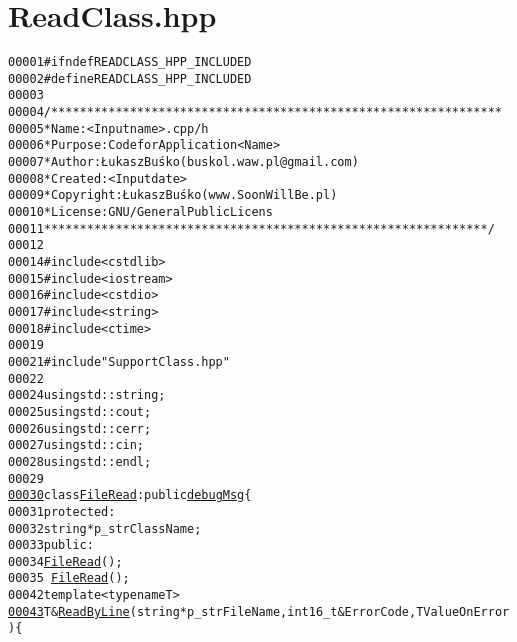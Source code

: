 \hypertarget{ReadClass_8hpp_source}{
\section{ReadClass.hpp}
}


\begin{footnotesize}\begin{alltt}
00001 \textcolor{preprocessor}{#ifndef READCLASS\_HPP\_INCLUDED}
00002 \textcolor{preprocessor}{}\textcolor{preprocessor}{#define READCLASS\_HPP\_INCLUDED}
00003 \textcolor{preprocessor}{}
00004 \textcolor{comment}{/***************************************************************}
00005 \textcolor{comment}{ * Name:      <Input name>.cpp/h}
00006 \textcolor{comment}{ * Purpose:   Code for Application <Name>}
00007 \textcolor{comment}{ * Author:    Łukasz Buśko (buskol.waw.pl@gmail.com)}
00008 \textcolor{comment}{ * Created:   <Input date>}
00009 \textcolor{comment}{ * Copyright: Łukasz Buśko (www.SoonWillBe.pl)}
00010 \textcolor{comment}{ * License:   GNU / General Public Licens}
00011 \textcolor{comment}{ **************************************************************/}
00012 
00014 \textcolor{preprocessor}{#include <cstdlib>}
00015 \textcolor{preprocessor}{#include <iostream>}
00016 \textcolor{preprocessor}{#include <cstdio>}
00017 \textcolor{preprocessor}{#include <string>}
00018 \textcolor{preprocessor}{#include <ctime>}
00019 
00021 \textcolor{preprocessor}{#include "SupportClass.hpp"}
00022 
00024 \textcolor{keyword}{using} std::string;
00025 \textcolor{keyword}{using} std::cout;
00026 \textcolor{keyword}{using} std::cerr;
00027 \textcolor{keyword}{using} std::cin;
00028 \textcolor{keyword}{using} std::endl;
00029 
\hypertarget{ReadClass_8hpp_source_l00030}{}\hyperlink{classFileRead}{00030} \textcolor{keyword}{class }\hyperlink{classFileRead}{FileRead}: \textcolor{keyword}{public} \hyperlink{classdebugMsg}{debugMsg}\{
00031     \textcolor{keyword}{protected}:
00032         \textcolor{keywordtype}{string} *p\_strClassName;
00033     \textcolor{keyword}{public}:
00034         \hyperlink{classFileRead_ad19f0ae8129a9e0750f37ba4741ab32b}{FileRead}();
00035         ~\hyperlink{classFileRead}{FileRead}();
00042         \textcolor{keyword}{template} <\textcolor{keyword}{typename} T>
\hypertarget{ReadClass_8hpp_source_l00043}{}\hyperlink{classFileRead_afd22580b16770d0abaf75c63098e6103}{00043}         T &\hyperlink{classFileRead_afd22580b16770d0abaf75c63098e6103}{ReadByLine}(\textcolor{keywordtype}{string} *p\_strFileName, int16\_t &ErrorCode, T ValueOnError)\{
      

\end{alltt}
\end{footnotesize}
